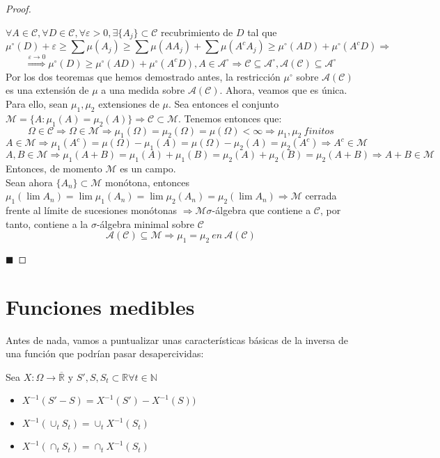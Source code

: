\documentclass[12pt,a4paper]{book}
\newcommand*{\qed}{\hfill\ensuremath{\blacksquare}}
\begin{document}
\begin{proof}
	\

$\forall A \in \mathcal{C}, \forall D \in \mathcal{C}, \forall \varepsilon>0, \exists \{A_j\} \subset \mathcal{C}$ recubrimiento de $D$ tal que
$$\mu^\circ(D) + \varepsilon \geq \sum \mu(A_j) \geq \sum \mu (AA_j) + \sum \mu (A^cA_j) \geq \mu^\circ(AD) + \mu^\circ(A^cD) \Rightarrow$$
$$ \stackrel{\varepsilon \to 0}{\Rightarrow} \mu^\circ(D) \geq \mu^\circ(AD) + \mu^\circ(A^cD), A \in \mathcal{A}^\circ \Rightarrow \mathcal{C} \subseteq \mathcal{A}^\circ, \mathcal{A}(\mathcal{C}) \subseteq \mathcal{A}^\circ $$
Por los dos teoremas que hemos demostrado antes, la restricción $\mu^\circ$ sobre $\mathcal{A}(\mathcal{C})$ es una extensión de $\mu$ a una medida sobre $\mathcal{A}(\mathcal{C})$. Ahora, veamos que es única. Para ello, sean $\mu_1, \mu_2$ extensiones de $\mu$. Sea entonces el conjunto $\mathcal{M} = \{A: \mu_1(A) = \mu_2(A)\} \Rightarrow \mathcal{C} \subset \mathcal{M}$. Tenemos entonces que:
$$ \Omega \in \mathcal{C} \Rightarrow \Omega \in \mathcal{M} \Rightarrow \mu_1(\Omega) = \mu_2(\Omega) = \mu(\Omega) < \infty \Rightarrow \mu_1, \mu_2 \: finitos $$
$$ A \in \mathcal{M} \Rightarrow \mu_1(A^c) = \mu(\Omega) - \mu_1(A) = \mu(\Omega) - \mu_2(A) = \mu_2(A^c) \Rightarrow A^c \in \mathcal{M} $$
$$ A,B \in \mathcal{M} \Rightarrow \mu_1(A+B) = \mu_1(A) + \mu_1(B) = \mu_2(A) + \mu_2(B) = \mu_2(A+B) \Rightarrow A+B \in \mathcal{M}$$
Entonces, de momento $\mathcal{M}$ es un campo.\\

Sean ahora $\{A_n\} \subset \mathcal{M}$ monótona, entonces $\mu_1(\lim A_n) = \lim \mu_1(A_n) = \lim \mu_2(A_n) = \mu_2(\lim A_n) \Rightarrow \mathcal{M}$ cerrada frente al límite de sucesiones monótonas $\Rightarrow \mathcal{M} \sigma$-álgebra que contiene a $\mathcal{C}$, por tanto, contiene a la $\sigma$-álgebra minimal sobre $\mathcal{C}$
$$ \mathcal{A}(\mathcal{C}) \subseteq \mathcal{M} \Rightarrow \mu_1 = \mu_2 \: en \: \mathcal{A}(\mathcal{C})$$

\qed
\end{proof}

\chapter{Funciones medibles}

Antes de nada, vamos a puntualizar unas características básicas de la inversa de una función que podrían pasar desapercividas:

\begin{lemma}
	Sea $X: \Omega \to \overline{\mathbb{R}}$ y $S',S, S_t \subset \mathbb{R} \forall t	\in \mathbb{N}$
	\begin{itemize}
		\item $X^{-1}(S'-S)=X^{-1}(S')-X^{-1}(S))$	
		\item $X^{-1}(\cup_t S_t)=\cup_t X^{-1}(S_t)$
		\item $X^{-1}(\cap_t S_t)=\cap_t X^{-1}(S_t)$
	\end{itemize}
\end{lemma}
\end{document}
